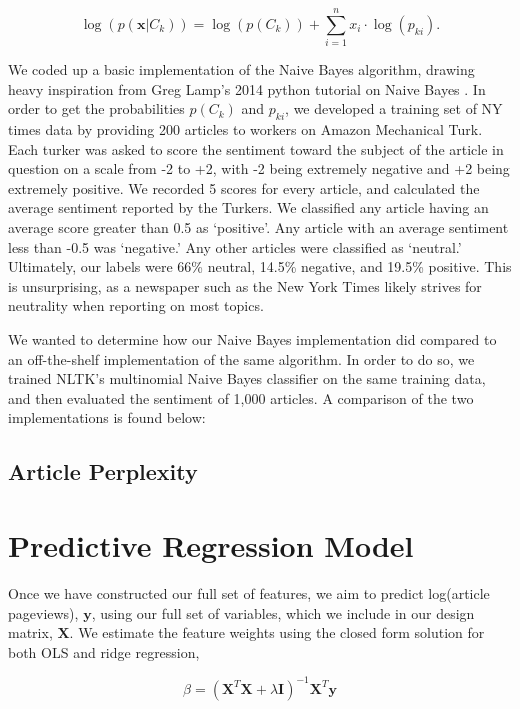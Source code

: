 \documentclass[fleqn,12pt]{SelfArx} %
\begin{document}
\begin{equation}
\log(p(\mathbf{x}|C_k)) = \log ( p(C_k)) + \sum_{i=1}^n x_i \cdot \log(p_{ki}).
\end{equation}

We coded up a basic implementation of the Naive Bayes algorithm, drawing heavy inspiration from Greg Lamp's 2014 python tutorial on Naive Bayes \cite{NaiveBayes}. In order to get the probabilities $p(C_k)$ and $p_{ki}$, we developed a training set of NY times data by providing 200 articles to workers on Amazon Mechanical Turk. Each turker was asked to score the sentiment toward the subject of the article in question on a scale from -2 to +2, with -2 being extremely negative and +2 being extremely positive. We recorded 5 scores for every article, and calculated the average sentiment reported by the Turkers. We classified any article having an average score greater than 0.5 as `positive'. Any article with an average sentiment less than -0.5 was `negative.' Any other articles were classified as `neutral.' Ultimately, our labels were 66\% neutral, 14.5\% negative, and 19.5\% positive. This is unsurprising, as a newspaper such as the New York Times likely strives for neutrality when reporting on most topics.

We wanted to determine how our Naive Bayes implementation did compared to an off-the-shelf implementation of the same algorithm. In order to do so, we trained NLTK's multinomial Naive Bayes classifier on the same training data, and then evaluated the sentiment of 1,000 articles. A comparison of the two implementations is found below:



\subsection{Article Perplexity}

\section{Predictive Regression Model}

Once we have constructed our full set of features, we aim to predict log(article pageviews), $\mathbf{y}$, using our full set of variables, which we include in our design matrix, $\mathbf{X}$. We estimate the feature weights using the closed form solution for both OLS and ridge regression,

\begin{center}
\begin{equation}
\beta = (\mathbf{X}^T\mathbf{X} + \lambda \mathbf{I})^{-1}\mathbf{X}^T\mathbf{y}
\end{equation}
\end{center}
\end{document}
